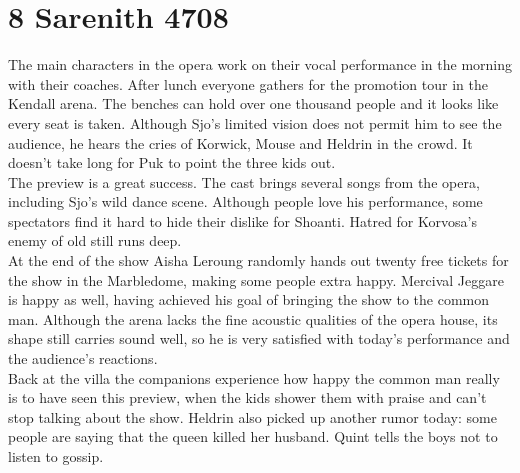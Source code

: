\section{8 Sarenith 4708}

The main characters in the opera work on their vocal performance in the morning with their coaches. After lunch everyone gathers for the promotion tour in the Kendall arena. The benches can hold over one thousand people and it looks like every seat is taken. Although Sjo's limited vision does not permit him to see the audience, he hears the cries of Korwick, Mouse and Heldrin in the crowd. It doesn't take long for Puk to point the three kids out.\\

The preview is a great success. The cast brings several songs from the opera, including Sjo's wild dance scene. Although people love his performance, some spectators find it hard to hide their dislike for Shoanti. Hatred for Korvosa's enemy of old still runs deep.\\

At the end of the show Aisha Leroung randomly hands out twenty free  tickets for the show in the Marbledome, making some people extra happy. Mercival Jeggare is happy as well, having achieved his goal of bringing the show to the common man. Although the arena lacks the fine acoustic qualities of the opera house, its shape still carries sound well, so he is very satisfied with today's performance and the audience's reactions.\\

Back at the villa the companions experience how happy the common man really is to have seen this preview, when the kids shower them with praise and can't stop talking about the show. Heldrin also picked up another rumor today: some people are saying that the queen killed her husband. Quint tells the boys not to listen to gossip.\\

